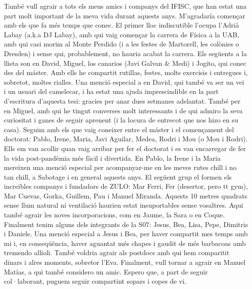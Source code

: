 {%
També vull agrair a tots els meus amics i companys del IFISC, que han estat una
part molt important de la meva vida durant aquests anys. M'agradaría començar
amb els que fa més temps que conec. El primer lloc indiscutible l'ocupa l'Adrià
Labay (a.k.a DJ Labay), amb qui vaig començar la carrera de Física a la UAB,
amb qui casi morim al Monte Perdido (i a les festes de Martorell, les colònies
o Dresden) i sense qui, probablement, no hauria acabat la carrera. Els següents
a la llista son en David, Miguel, los canarios (Javi Galvan \& Medi) i Jogito,
qui conec des del máster. Amb ells he compartit rutillas, festes, molts
exercisis i entregues i, sobretot, moltes rialles. Una menció especial a en
David, qui també va ser un vei i un usuari del camelecar, i ha estat una ajuda
imprescindible en la part d'escritura d'aquesta tesi: gracies per anar dues
setmanes adelantat. També per en Miguel, amb qui he tingut converses molt
interessants i de qui admiro la seva curiositat i ganes de seguir aprenent (i
la locura de entrecot que nos hizo en su casa). Seguim amb els que vaig
coneixer entre el máster i el començament del doctorat: Pablo, Irene, Maria,
Javi Aguilar, Medea, Rodri i Mou (o Mou i Rodri). Ells em van acollir quan vaig
arribar per fer el doctorat i es van encarregar de fer la vida post-pandèmia
més fàcil i divertida. En Pablo, la Irene i la Maria mereixen una menció
especial per acompanyar-me en les meves rutes chill i no tan chill, a Sabotage
i en general aquests anys. El següent grup el formen els increibles companys i
fundadors de ZULO: Mar Ferri, Fer (desertor, pero tt gym), Mar Cuevas, Gorka,
Guillem, Pau i Manuel Miranda. Aquests 10 metres quadrats sense llum natural ni
ventilació haurien estat insuportables sense vosaltres. Aqui també agrair les
noves incorporacions, com en Jaume, la Sara o en Coque. Finalment tenim alguns
dels integrants de la S07: Jesus, Bea, Lisa, Pepe, Dimitris i Daniele. Una
menció especial a Jesus i Bea, per haver compartit mes temps amb mi i, en
conseqüència, haver aguantat més chapes i gaudit de més barbacoas amb tremendo
allioli. També voldria agrair als postdocs amb qui hem comparitit dinars i
alres moments, sobretor l'Eva. Finalment, vull tornar a agrair en Manuel
Matías, a qui també considero un amic. Espero que, a part de seguir
col·laborant, puguem seguir compartint sopars i copes de vi. \\

}
